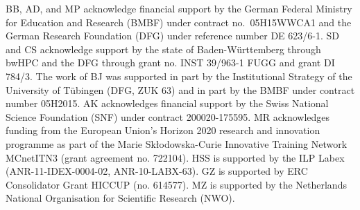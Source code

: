 \documentclass[twocolumn,epjc3]{svjour3} %
\begin{document}
BB, AD, and MP acknowledge financial support by the
German Federal Ministry for Education and Research (BMBF) under
contract no.~05H15WWCA1 and the German Research Foundation (DFG) under
reference number DE 623/6-1.
SD and CS acknowledge support by the state of Baden-W\"urttemberg through bwHPC and the DFG through grant no. INST 39/963-1 FUGG and grant DI 784/3.
The work of BJ was supported in part by the Institutional Strategy of the University of T\"ubingen (DFG, ZUK 63) and in part by
the BMBF under contract number 05H2015.
AK acknowledges financial support by the Swiss National Science Foundation (SNF) under contract 200020-175595.
MR acknowledges funding from the European Union's Horizon 2020 research and innovation programme as part of the Marie Sk\l{}odowska-Curie Innovative Training Network MCnetITN3 (grant agreement no. 722104).
HSS is supported by the ILP Labex (ANR-11-IDEX-0004-02, ANR-10-LABX-63).
GZ is supported by ERC Consolidator Grant HICCUP (no. 614577).
MZ is supported by the Netherlands National Organisation for Scientific Research (NWO).



\end{document}
